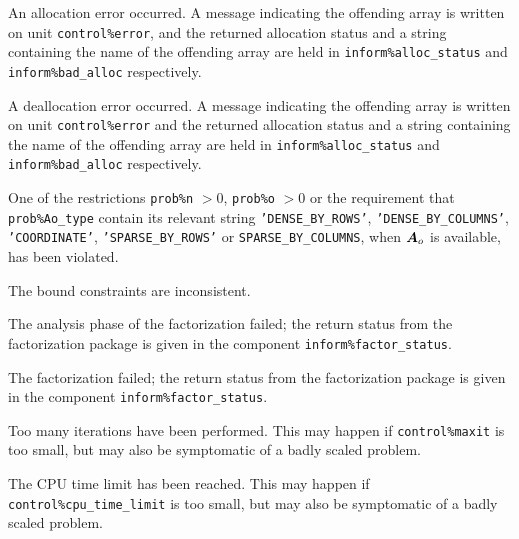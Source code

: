 \documentclass{galahad}
\begin{document}
\begin{description}

 An allocation error occurred. A message indicating
the offending
array is written on unit {\tt control\%error}, and the returned allocation
status and a string containing the name of the offending array
are held in {\tt inform\%alloc\_\-status}
and {\tt inform\%bad\_alloc} respectively.

 A deallocation error occurred.
A message indicating the offending
array is written on unit {\tt control\%error} and the returned allocation
status and a string containing the name of the offending array
are held in {\tt inform\%alloc\_\-status}
and {\tt inform\%bad\_alloc} respectively.

 One of the restrictions
 {\tt prob\%n} $> 0$,
 {\tt prob\%o} $> 0$
    or the requirement that
    {\tt prob\%Ao\_type} contain its relevant string
    {\tt 'DENSE\_BY\_ROWS'}, 
    {\tt 'DENSE\_BY\_COLUMNS'}, {\tt 'COORDINATE'}, {\tt 'SPARSE\_BY\_ROWS'}
    or {\tt SPARSE\_BY\_COLUMNS},
    when ${\bm{A}}_o$ is available,  has been violated.


 The bound constraints are inconsistent.


 The analysis phase of the factorization failed;
  the return status from the factorization
    package is given in the component {\tt inform\%fac\-t\-or\_status}.

 The factorization failed; the return status
  from the factorization
    package is given in the component {\tt inform\%fac\-t\-or\_status}.



 Too many iterations have been performed.
   This may happen if
    {\tt control\%maxit} is too small, but may also be symptomatic of
    a badly scaled problem.

 The CPU time limit has been reached. This may happen if
    {\tt control\%cpu\_time\_limit} is too small, but may also be symptomatic
    of a badly scaled problem.


\end{description}
\end{document}
